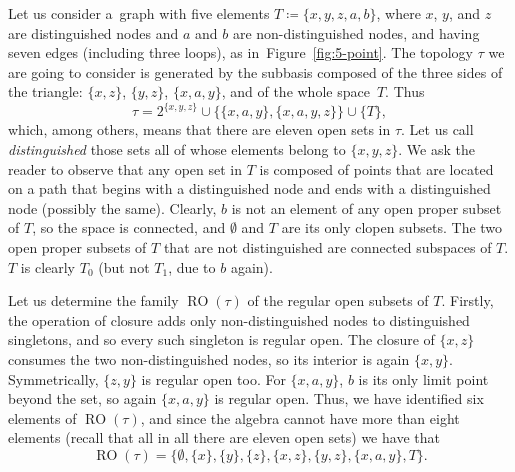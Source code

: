 \documentclass[a4paper,12pt]{amsart}
\numberwithin{equation}{section}
\theoremstyle{mytheoremstyle}
\DeclareMathOperator{\ROvtex}{RO}
\begin{document}
Let us consider a~graph with five elements
$T\coloneqq \{x,y,z,a,b\}$, where $x$, $y$, and $z$ are distinguished nodes and $a$ and $b$ are non-distinguished nodes, and having seven
edges (including three loops), as in~Figure~\ref{fig:5-point}. The topology
$\tau $ we are going to consider is generated by the subbasis composed
of the three sides of the triangle: $\{x,z\}$, $\{y,z\}$,
$\{x,a,y\}$, and of the whole space~$T$.
Thus
%
\begin{equation*}
\tau =2^{\{x,y,z\}}\cup \bigl\{\{x,a,y\},\{x,a,y,z\}\bigr\}\cup \{T
\},
\end{equation*}
%
which, among others, means that there are eleven open sets in
$\tau $. Let us call \emph{distinguished} those sets all of whose elements belong to $\{x,y,z\}$. We ask the reader to observe that any open set in $T$ is composed
of points that are located on a path that begins with a distinguished node and ends
with a distinguished node (possibly the same). Clearly, $b$ is not an element of
any open proper subset of $T$, so the space is connected, and
$\emptyset $ and $T$ are its only clopen subsets. The two open proper subsets
of $T$ that are not distinguished are connected subspaces of $T$. $T$ is clearly
$T_{0}$ (but not $T_{1}$, due to $b$ again).

Let us determine the family $\ROvtex (\tau )$ of the regular open subsets of
$T$. Firstly, the operation of closure adds only non-distinguished nodes to distinguished singletons,
and so every such singleton is regular open. The closure of
$\{x,z\}$ consumes the two non-distinguished nodes, so its interior is again
$\{x,y\}$. Symmetrically, $\{z,y\}$ is regular open too. For
$\{x,a,y\}$, $b$ is its only limit point beyond the set, so again
$\{x,a,y\}$ is regular open. Thus, we have identified six elements of
$\ROvtex (\tau )$, and since the algebra cannot have more than eight elements (recall
that all in all there are eleven open sets) we have that
%
\begin{equation*}
\ROvtex (\tau )=\bigl\{\emptyset ,\{x\},\{y\},\{z\},\{x,z\},\{y,z\},\{x,a,y\},T
\bigr\}.
\end{equation*}
\end{document}
